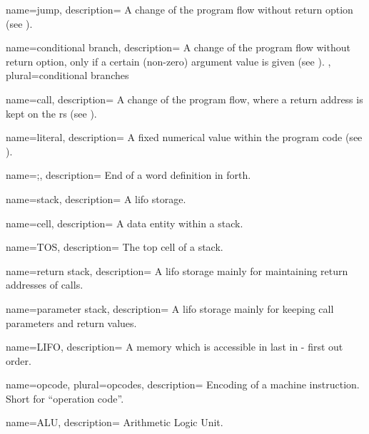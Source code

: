 {
    name={jump},
    description={
      A change of the program flow without return option (see ).
      \nopostdesc
    }
}

 {
    name={conditional branch},
    description={
      A change of the program flow without return option, only if a certain (non-zero)
      argument value is given (see ).
      \nopostdesc
    },
    plural={conditional branches}
}

 {
    name={call},
    description={
      A change of the program flow, where a return address is kept
      on the \gls{rs} (see ).
      \nopostdesc
    }
}

 {
    name={literal},
    description={
      A fixed numerical value within the program code (see ).
      \nopostdesc
    }
}

 {
    name={;},
    description={
      End of a \gls{word} definition in \Gls{forth}.
      \nopostdesc
    }
}

 {
    name={stack},
    description={
      A \gls{lifo} storage.
      \nopostdesc
    }
}

 {
    name={cell},
    description={
      A data entity within a \gls{stack}.
      \nopostdesc
    }
}

 {
    name={TOS},
    description={
      The top \gls{cell} of a \gls{stack}.
      \nopostdesc
    }
}

 {
    name={return stack},
    description={
      A \gls{lifo} storage mainly for maintaining return addresses
      of \glspl{call}.
      \nopostdesc
    }
}

 {
    name={parameter stack},
    description={
      A \gls{lifo} storage mainly for keeping call parameters and
      return values.
      \nopostdesc
    }
}

 {
    name={LIFO},
    description={
      A memory which is accessible in last in - first out order.
      \nopostdesc
    }
}

 {
    name={opcode},
    plural={opcodes},
    description={
      Encoding of a machine instruction. Short for ``operation code''.
      \nopostdesc
    }
}

 {
    name={ALU},
    description={
      Arithmetic Logic Unit.
      \nopostdesc
    }
}

